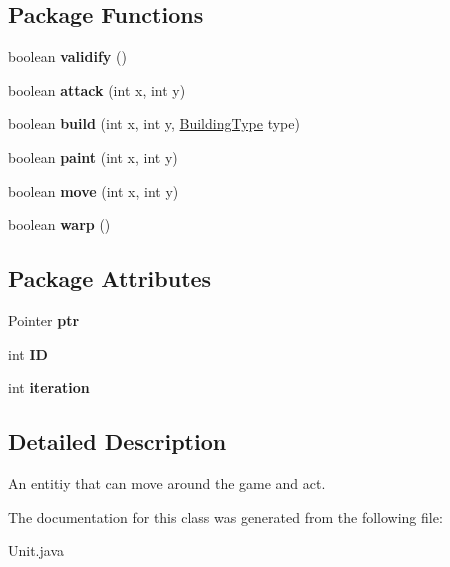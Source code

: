 \subsection*{Package Functions}
\begin{CompactItemize}
\item 
\hypertarget{classUnit_8df3b0dfbdee4fe5ada7df9d8cb80750}{
boolean \textbf{validify} ()}
\label{classUnit_8df3b0dfbdee4fe5ada7df9d8cb80750}

\item 
\hypertarget{classUnit_1199b3b179645f4af5c9494954dc00ce}{
boolean \textbf{attack} (int x, int y)}
\label{classUnit_1199b3b179645f4af5c9494954dc00ce}

\item 
\hypertarget{classUnit_28bd09714072e35088064a760568b52c}{
boolean \textbf{build} (int x, int y, \hyperlink{classBuildingType}{BuildingType} type)}
\label{classUnit_28bd09714072e35088064a760568b52c}

\item 
\hypertarget{classUnit_27e580199662c5d93f16e14144e41de6}{
boolean \textbf{paint} (int x, int y)}
\label{classUnit_27e580199662c5d93f16e14144e41de6}

\item 
\hypertarget{classUnit_80cf0558183b0d5b6cfbe350b12af63b}{
boolean \textbf{move} (int x, int y)}
\label{classUnit_80cf0558183b0d5b6cfbe350b12af63b}

\item 
\hypertarget{classUnit_951895ebd99f6809bd1a05037da8b754}{
boolean \textbf{warp} ()}
\label{classUnit_951895ebd99f6809bd1a05037da8b754}

\end{CompactItemize}
\subsection*{Package Attributes}
\begin{CompactItemize}
\item 
\hypertarget{classUnit_faff1a019fd4f591de47ce6430b313eb}{
Pointer \textbf{ptr}}
\label{classUnit_faff1a019fd4f591de47ce6430b313eb}

\item 
\hypertarget{classUnit_09e449aa409230d3187fecab576c375f}{
int \textbf{ID}}
\label{classUnit_09e449aa409230d3187fecab576c375f}

\item 
\hypertarget{classUnit_721e27b9282d18ef51963d6d952515b9}{
int \textbf{iteration}}
\label{classUnit_721e27b9282d18ef51963d6d952515b9}

\end{CompactItemize}


\subsection{Detailed Description}
An entitiy that can move around the game and act. 

The documentation for this class was generated from the following file:\begin{CompactItemize}
\item 
Unit.java\end{CompactItemize}
